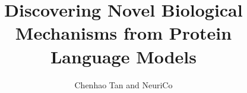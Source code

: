 \documentclass{article}
\title{Discovering Novel Biological Mechanisms from Protein Language Models}
\author{Chenhao Tan and NeuriCo}
\begin{document}
\maketitle

\begin{abstract}

\end{abstract}









\end{document}
